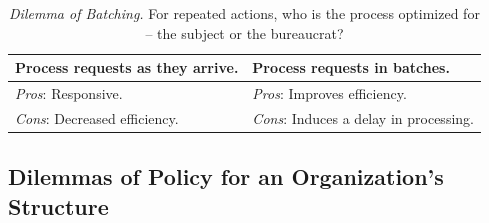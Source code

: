 

\begin{center}
\begin{table}[H] %
\begin{tabular}{ | m{\dilemmatablewidth}| m{\dilemmatablewidth} | } 
  \hline
  \textbf{Process requests as they arrive.} &
  \textbf{Process requests in batches.} \\
  \hline
  \textit{Pros}: Responsive. & 
  \textit{Pros}: Improves efficiency. \\
  \hline
  \textit{Cons}: Decreased efficiency. & 
  \textit{Cons}: Induces a delay in processing. \\
  \hline
\end{tabular}
\caption{
\textit{Dilemma of Batching.}
For repeated actions, who is the process optimized for -- the subject or the bureaucrat?
}
\label{table:dilemma-personal-batching-requests}
\end{table}
\end{center}


\subsection*{Dilemmas of Policy for an Organization's Structure\label{sec:org-dilemma}}


